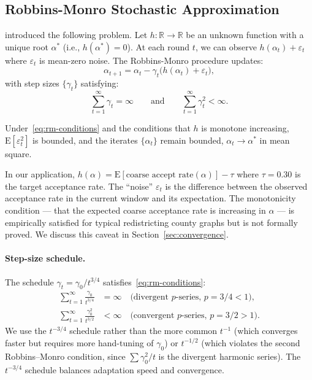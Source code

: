 \subsection{Robbins-Monro Stochastic Approximation}

\citet{robbins1951} introduced the following problem.
Let $h: \mathbb{R} \to \mathbb{R}$ be an unknown function with a unique root
$\alpha^*$ (i.e., $h(\alpha^*) = 0$).
At each round $t$, we can observe $h(\alpha_t) + \varepsilon_t$ where
$\varepsilon_t$ is mean-zero noise.
The Robbins-Monro procedure updates:
\[
  \alpha_{t+1} = \alpha_t - \gamma_t \bigl(h(\alpha_t) + \varepsilon_t\bigr),
\]
with step sizes $\{\gamma_t\}$ satisfying:
\begin{equation}
  \sum_{t=1}^\infty \gamma_t = \infty
  \qquad\text{and}\qquad
  \sum_{t=1}^\infty \gamma_t^2 < \infty.
  \label{eq:rm-conditions}
\end{equation}

\begin{theorem}
  \label{thm:rm}
  Under~\eqref{eq:rm-conditions} and the conditions that $h$ is monotone
  increasing, $\mathrm{E}[\varepsilon_t^2]$ is bounded, and the iterates
  $\{\alpha_t\}$ remain bounded, $\alpha_t \to \alpha^*$ in mean square.
\end{theorem}

In our application, $h(\alpha) = \mathrm{E}[\text{coarse accept rate}(\alpha)] - \tau$
where $\tau = 0.30$ is the target acceptance rate.
The ``noise'' $\varepsilon_t$ is the difference between the observed acceptance
rate in the current window and its expectation.
The monotonicity condition --- that the expected coarse acceptance rate is
increasing in $\alpha$ --- is empirically satisfied for typical redistricting
county graphs but is not formally proved.
We discuss this caveat in Section~\ref{sec:convergence}.

\paragraph{Step-size schedule.}
The schedule $\gamma_t = \gamma_0 / t^{3/4}$ satisfies~\eqref{eq:rm-conditions}:
\begin{align*}
  \sum_{t=1}^\infty \frac{\gamma_0}{t^{3/4}} &= \infty
  \quad \text{(divergent $p$-series, $p = 3/4 < 1$)}, \\
  \sum_{t=1}^\infty \frac{\gamma_0^2}{t^{3/2}} &< \infty
  \quad \text{(convergent $p$-series, $p = 3/2 > 1$)}.
\end{align*}
We use the $t^{-3/4}$ schedule rather than the more common $t^{-1}$ (which
converges faster but requires more hand-tuning of $\gamma_0$) or $t^{-1/2}$
(which violates the second Robbins--Monro condition, since
$\sum \gamma_0^2/t$ is the divergent harmonic series).
The $t^{-3/4}$ schedule balances adaptation speed and convergence.

